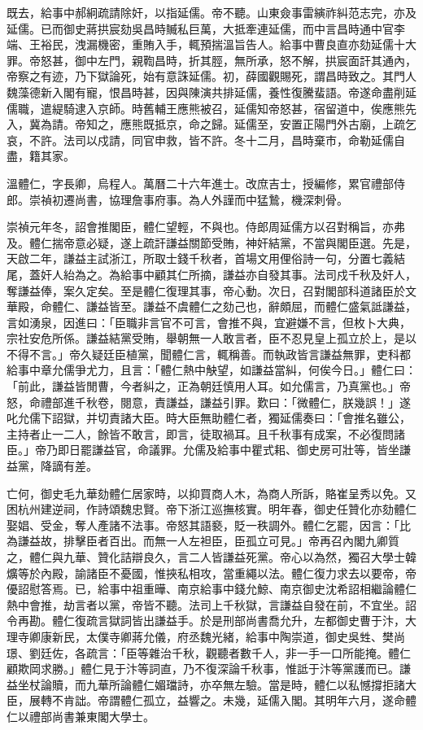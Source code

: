 \begin{pinyinscope}
既去，給事中郝絅疏請除奸，以指延儒。帝不聽。山東僉事雷縯祚糾范志完，亦及延儒。已而御史蔣拱宸劾吳昌時贓私巨萬，大抵牽連延儒，而中言昌時通中官李端、王裕民，洩漏機密，重賄入手，輒預揣溫旨告人。給事中曹良直亦劾延儒十大罪。帝怒甚，御中左門，親鞫昌時，折其脛，無所承，怒不解，拱宸面訐其通內，帝察之有迹，乃下獄論死，始有意誅延儒。初，薛國觀賜死，謂昌時致之。其門人魏藻德新入閣有寵，恨昌時甚，因與陳演共排延儒，養性復騰蜚語。帝遂命盡削延儒職，遣緹騎逮入京師。時舊輔王應熊被召，延儒知帝怒甚，宿留道中，俟應熊先入，冀為請。帝知之，應熊既抵京，命之歸。延儒至，安置正陽門外古廟，上疏乞哀，不許。法司以戍請，同官申救，皆不許。冬十二月，昌時棄市，命勒延儒自盡，籍其家。

溫體仁，字長卿，烏程人。萬曆二十六年進士。改庶吉士，授編修，累官禮部侍郎。崇禎初遷尚書，協理詹事府事。為人外謹而中猛鷙，機深刺骨。

崇禎元年冬，詔會推閣臣，體仁望輕，不與也。侍郎周延儒方以召對稱旨，亦弗及。體仁揣帝意必疑，遂上疏訐謙益關節受賄，神奸結黨，不當與閣臣選。先是，天啟二年，謙益主試浙江，所取士錢千秋者，首場文用俚俗詩一句，分置七義結尾，蓋奸人紿為之。為給事中顧其仁所摘，謙益亦自發其事。法司戍千秋及奸人，奪謙益俸，案久定矣。至是體仁復理其事，帝心動。次日，召對閣部科道諸臣於文華殿，命體仁、謙益皆至。謙益不虞體仁之劾己也，辭頗屈，而體仁盛氣詆謙益，言如湧泉，因進曰：「臣職非言官不可言，會推不與，宜避嫌不言，但枚卜大典，宗社安危所係。謙益結黨受賄，舉朝無一人敢言者，臣不忍見皇上孤立於上，是以不得不言。」帝久疑廷臣植黨，聞體仁言，輒稱善。而執政皆言謙益無罪，吏科都給事中章允儒爭尤力，且言：「體仁熱中觖望，如謙益當糾，何俟今日。」體仁曰：「前此，謙益皆閒曹，今者糾之，正為朝廷慎用人耳。如允儒言，乃真黨也。」帝怒，命禮部進千秋卷，閱意，責謙益，謙益引罪。歎曰：「微體仁，朕幾誤！」遂叱允儒下詔獄，并切責諸大臣。時大臣無助體仁者，獨延儒奏曰：「會推名雖公，主持者止一二人，餘皆不敢言，即言，徒取禍耳。且千秋事有成案，不必復問諸臣。」帝乃即日罷謙益官，命議罪。允儒及給事中瞿式耜、御史房可壯等，皆坐謙益黨，降謫有差。

亡何，御史毛九華劾體仁居家時，以抑買商人木，為商人所訴，賂崔呈秀以免。又困杭州建逆祠，作詩頌魏忠賢。帝下浙江巡撫核實。明年春，御史任贊化亦劾體仁娶娼、受金，奪人產諸不法事。帝怒其語褻，貶一秩調外。體仁乞罷，因言：「比為謙益故，排擊臣者百出。而無一人左袒臣，臣孤立可見。」帝再召內閣九卿質之，體仁與九華、贊化詰辯良久，言二人皆謙益死黨。帝心以為然，獨召大學士韓爌等於內殿，諭諸臣不憂國，惟挾私相攻，當重繩以法。體仁復力求去以要帝，帝優詔慰答焉。已，給事中祖重曄、南京給事中錢允鯨、南京御史沈希詔相繼論體仁熱中會推，劫言者以黨，帝皆不聽。法司上千秋獄，言謙益自發在前，不宜坐。詔令再勘。體仁復疏言獄詞皆出謙益手。於是刑部尚書喬允升，左都御史曹于汴，大理寺卿康新民，太僕寺卿蔣允儀，府丞魏光緒，給事中陶崇道，御史吳甡、樊尚璟、劉廷佐，各疏言：「臣等雜治千秋，觀聽者數千人，非一手一口所能掩。體仁顧欺岡求勝。」體仁見于汴等詞直，乃不復深論千秋事，惟詆于汴等黨護而已。謙益坐杖論贖，而九華所論體仁媚璫詩，亦卒無左驗。當是時，體仁以私憾撐拒諸大臣，展轉不肯詘。帝謂體仁孤立，益響之。未幾，延儒入閣。其明年六月，遂命體仁以禮部尚書兼東閣大學士。


\end{pinyinscope}
